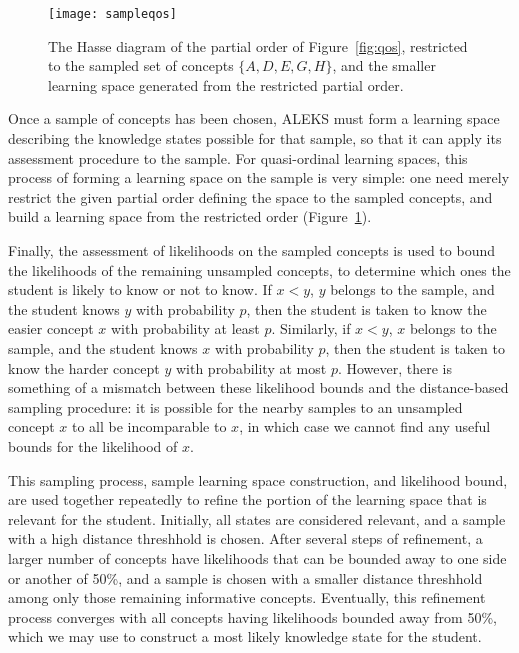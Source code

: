\documentclass[11pt]{llncs}
\begin{document}
{\begin{figure}[t]
\centering\texttt{[image: sampleqos]}
\caption{The Hasse diagram of the partial order of Figure~\ref{fig:qos}, restricted to the sampled set of concepts $\{A,D,E,G,H\}$, and the smaller learning space generated from the restricted partial order.}
\label{fig:sampleqos}
\end{figure}

Once a sample of concepts has been chosen, ALEKS must form a learning space describing the knowledge states possible for that sample, so that it can apply its assessment procedure to the sample.
For quasi-ordinal learning spaces, this process of forming a learning space on the sample is very simple: one need merely restrict the given partial order defining the space to the sampled concepts, and build a learning space from the restricted order (Figure~\ref{fig:sampleqos}).

Finally, the assessment of likelihoods on the sampled concepts is used to bound the likelihoods of the remaining unsampled concepts, to determine which ones the student is likely to know or not to know.
If $x<y$, $y$ belongs to the sample, and the student knows $y$ with probability $p$, then the student is taken to know the easier concept $x$ with probability at least $p$. Similarly, if $x<y$, $x$ belongs to the sample, and the student knows $x$ with probability $p$, then the student is taken to know the harder concept $y$ with probability at most $p$. However, there is something of a mismatch between these likelihood bounds and the distance-based sampling procedure: it is possible for the nearby samples to an unsampled concept $x$ to all be incomparable to $x$, in which case we cannot find any useful bounds for the likelihood of $x$.

This sampling process, sample learning space construction, and likelihood bound, are used together repeatedly to refine the portion of the learning space that is relevant for the student. Initially, all states are considered relevant, and a sample with a high distance threshhold is chosen. After several steps of refinement, a larger number of concepts have likelihoods that can be bounded away to one side or another of 50\%, and a sample is chosen with a smaller distance threshhold among only those remaining informative concepts. Eventually, this refinement process converges with all concepts having likelihoods bounded away from 50\%, which we may use to construct a most likely knowledge state for the student.

}
\end{document}
